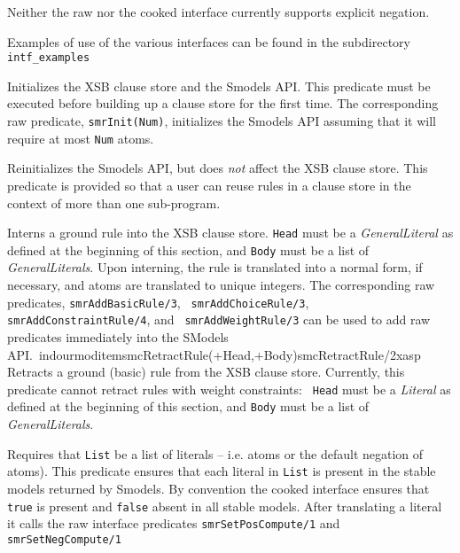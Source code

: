 Neither the raw nor the cooked interface currently supports explicit
negation.

Examples of use of the various interfaces can be found in the
subdirectory {\tt intf\_examples}

\begin{description}

%
Initializes the XSB clause store and the Smodels API.  This predicate
must be executed before building up a clause store for the first time.
The corresponding raw predicate, {\tt smrInit(Num)}, initializes the
Smodels API assuming that it will require at most {\tt Num} atoms.

%
Reinitializes the Smodels API, but does \emph{not} affect the XSB
clause store.  This predicate is provided so that a user can reuse
rules in a clause store in the context of more than one sub-program.

%
Interns a ground rule into the XSB clause store.  {\tt Head} must be a
\emph{GeneralLiteral} as defined at the beginning of this section, and
     {\tt Body} must be a list of \emph{GeneralLiterals}.  Upon
     interning, the rule is translated into a normal form, if
     necessary, and atoms are translated to unique integers.  The
     corresponding raw predicates, {\tt smrAddBasicRule/3}, {\tt
       smrAddChoiceRule/3}, {\tt smrAddConstraintRule/4}, and {\tt
       smrAddWeightRule/3} can be used to add raw predicates
     immediately into the SModels API.\
indourmoditem{smcRetractRule(+Head,+Body)}{smcRetractRule/2}{xasp}
%
Retracts a ground (basic) rule from the XSB clause store.  Currently,
this predicate cannot retract rules with weight constraints: {\tt
  Head} must be a \emph{Literal} as defined at the beginning of this
section, and {\tt Body} must be a list of \emph{GeneralLiterals}.


%
Requires that {\tt List} be a list of literals -- i.e. atoms or the
default negation of atoms).  This predicate ensures that each literal
in {\tt List} is present in the stable models returned by Smodels.  By
convention the cooked interface ensures that {\tt true} is present and
{\tt false} absent in all stable models.  After translating a literal
it calls the raw interface predicates {\tt smrSetPosCompute/1} and
{\tt smrSetNegCompute/1}


\end{description}
